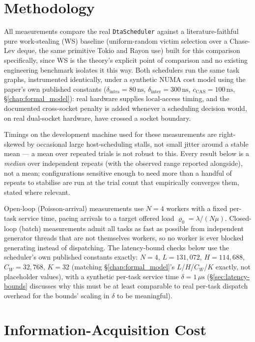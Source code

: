 \documentclass[11pt,a4paper]{report}
\newcommand{\code}[1]{\texttt{#1}}
\begin{document}
\section{Methodology}
\label{sec:methodology}

All measurements compare the real \code{DtaScheduler} against a
literature-faithful pure work-stealing (WS) baseline (uniform-random
victim selection over a Chase-Lev deque, the same primitive Tokio and
Rayon use) built for this comparison specifically, since WS is the
theory's explicit point of comparison and no existing engineering
benchmark isolates it this way. Both schedulers run the same task
graphs, instrumented identically, under a synthetic NUMA cost model
using the paper's own published constants ($\delta_{\mathrm{intra}} =
80\,\mathrm{ns}$, $\delta_{\mathrm{inter}} = 300\,\mathrm{ns}$,
$c_{\mathrm{CAS}} = 100\,\mathrm{ns}$, \S\ref{chap:formal_model}): real
hardware supplies local-access timing, and the documented cross-socket
penalty is added whenever a scheduling decision would, on real
dual-socket hardware, have crossed a socket boundary.

Timings on the development machine used for these measurements are
right-skewed by occasional large host-scheduling stalls, not small
jitter around a stable mean — a mean over repeated trials is not robust
to this. Every result below is a \emph{median} over independent
repeats (with the observed range reported alongside), not a mean;
configurations sensitive enough to need more than a handful of repeats
to stabilise are run at the trial count that empirically converges
them, stated where relevant.

Open-loop (Poisson-arrival) measurements use
$N=4$ workers with a fixed per-task service time,
pacing arrivals to a target offered load $\varrho_0 = \lambda/(N\mu)$.
Closed-loop (batch) measurements admit all tasks as fast as possible
from independent generator threads that are not themselves workers, so
no worker is ever blocked generating instead of dispatching. The
latency-bound checks below use the scheduler's own published
constants exactly: $N=4$, $L = 131{,}072$, $H = 114{,}688$,
$C_W = 32{,}768$, $K = 32$ (matching \S\ref{chap:formal_model}'s
$L$/$H$/$C_W$/$K$ exactly, not placeholder values), with a synthetic
per-task service time $\delta = 1\,\mu\mathrm{s}$
(\S\ref{sec:latency-bounds} discusses why this must be at least
comparable to real per-task dispatch overhead for the bounds' scaling
in $\delta$ to be meaningful).

\section{Information-Acquisition Cost}
\label{sec:empirical-beta}
\end{document}

